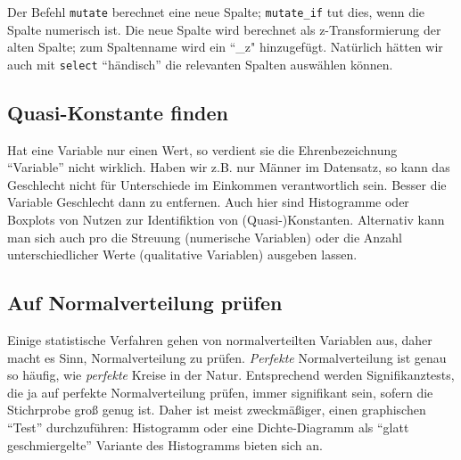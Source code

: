\documentclass[12pt,]{book}
\newenvironment{Shaded}{\begin{snugshade}}{\end{snugshade}}
\newcommand{\KeywordTok}[1]{\textcolor[rgb]{0.13,0.29,0.53}{\textbf{{#1}}}}
\newcommand{\DataTypeTok}[1]{\textcolor[rgb]{0.13,0.29,0.53}{{#1}}}
\newcommand{\DecValTok}[1]{\textcolor[rgb]{0.00,0.00,0.81}{{#1}}}
\newcommand{\StringTok}[1]{\textcolor[rgb]{0.31,0.60,0.02}{{#1}}}
\newcommand{\NormalTok}[1]{{#1}}
\begin{document}
Der Befehl \texttt{mutate} berechnet eine neue Spalte;
\texttt{mutate\_if} tut dies, wenn die Spalte numerisch ist. Die neue
Spalte wird berechnet als z-Transformierung der alten Spalte; zum
Spaltenname wird ein ``\_z" hinzugefügt. Natürlich hätten wir auch mit
\texttt{select} ``händisch'' die relevanten Spalten auswählen können.

\subsection{Quasi-Konstante finden}\label{quasi-konstante-finden}

Hat eine Variable nur einen Wert, so verdient sie die Ehrenbezeichnung
``Variable'' nicht wirklich. Haben wir z.B. nur Männer im Datensatz, so
kann das Geschlecht nicht für Unterschiede im Einkommen verantwortlich
sein. Besser die Variable Geschlecht dann zu entfernen. Auch hier sind
Histogramme oder Boxplots von Nutzen zur Identifiktion von
(Quasi-)Konstanten. Alternativ kann man sich auch pro die Streuung
(numerische Variablen) oder die Anzahl unterschiedlicher Werte
(qualitative Variablen) ausgeben lassen.

\subsection{Auf Normalverteilung
prüfen}\label{auf-normalverteilung-prufen}

Einige statistische Verfahren gehen von normalverteilten Variablen aus,
daher macht es Sinn, Normalverteilung zu prüfen. \emph{Perfekte}
Normalverteilung ist genau so häufig, wie \emph{perfekte} Kreise in der
Natur. Entsprechend werden Signifikanztests, die ja auf perfekte
Normalverteilung prüfen, immer signifikant sein, sofern die Stichrprobe
groß genug ist. Daher ist meist zweckmäßiger, einen graphischen ``Test''
durchzuführen: Histogramm oder eine Dichte-Diagramm als ``glatt
geschmiergelte'' Variante des Histogramms bieten sich an.

\begin{Shaded}
\end{Shaded}
\end{document}
